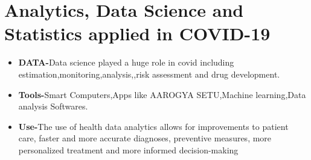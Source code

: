\documentclass[12pt]{article}
\begin{document}
\section{Analytics, Data Science and Statistics applied in COVID-19} 
\begin{itemize}


\item \textbf{DATA-}Data science played a huge role in covid including estimation,monitoring,analysis,,risk assessment and drug development.

\item \textbf{Tools-}Smart Computers,Apps like AAROGYA SETU,Machine learning,Data analysis Softwares.

\item \textbf{Use-}The use of health data analytics allows for improvements to patient care, faster and more accurate diagnoses, preventive measures, more personalized treatment and more informed decision-making



\end{itemize}
\end{document}
